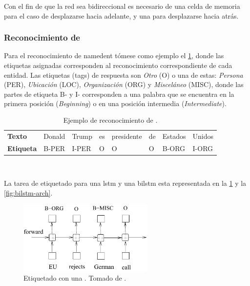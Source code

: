 Con el fin de que la red sea bidireccional es necesario de una celda de memoria para el caso de desplazarse hacia adelante, y una para desplazarse hacia atrás.

\subsubsection{Reconocimiento de }
Para el reconocimiento de \gls{namedent} tómese como ejemplo el \cref{table:namedent-example}, donde las etiquetas asignadas corresponden al reconocimiento correspondiente de cada entidad.
Las etiquetas (tags) de respuesta son \emph{Otro} (\textsc{O}) o una de estas: \emph{Persona} (\textsc{PER}), \emph{Ubicación} (\textsc{LOC}), \emph{Organización} (\textsc{ORG}) y \emph{Misceláneo} (\textsc{MISC}), donde las partes de etiqueta \textsc{B-} y \textsc{I-} corresponden a una palabra que se encuentra en la primera posición (\textsl{Beginning}) o en una posición intermedia (\textsl{Intermediate}).

\begin{table}[H]
  \centering
  \begin{tabular}{l|lllllll}
    \textbf{Texto}    & Donald   & Trump & es & presidente & de & Estados & Unidos \\
    \textbf{Etiqueta} & B-PER    & I-PER & O  & O          & O  & B-ORG   & I-ORG
  \end{tabular}
  \\ [1em]
  \decoRule
  \caption{Ejemplo de reconocimiento de .}
  \label{table:namedent-example}
\end{table}

La tarea de etiquetado para una \gls{lstm} y una \gls{bilstm} esta representada en la \cref{fig:lstm-arch} y la \cref{fig:bilstm-arch}.

\begin{figure}[H]
  \centering
  \includegraphics[width=0.6\textwidth]{Figures/lstm-arch.pdf}
\decoRule
\caption[Etiquetado con una ]{Etiquetado con una . Tomado de \cite{Huang2015}.}
\label{fig:lstm-arch}
\end{figure}

